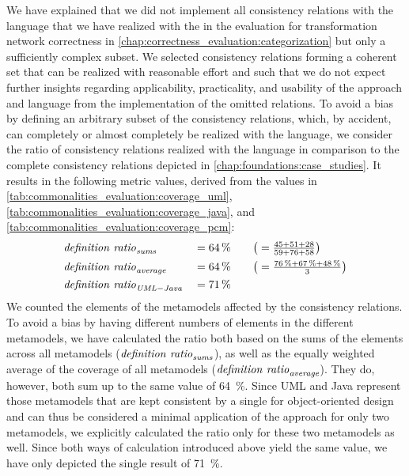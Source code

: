 We have explained that we did not implement all consistency relations with the \commonalities language that we have realized with the \reactionslanguage in the evaluation for transformation network correctness in \autoref{chap:correctness_evaluation:categorization} but only a sufficiently complex subset.
We selected consistency relations forming a coherent set that can be realized with reasonable effort and such that we do not expect further insights regarding applicability, practicality, and usability of the \commonalities approach and language from the implementation of the omitted relations.
To avoid a bias by defining an arbitrary subset of the consistency relations, which, by accident, can completely or almost completely be realized with the \commonalities language, we consider the ratio of consistency relations realized with the \commonalities language in comparison to the complete consistency relations depicted in \autoref{chap:foundations:case_studies}.
It results in the following metric values, derived from the values in \autoref{tab:commonalities_evaluation:coverage_uml}, \autoref{tab:commonalities_evaluation:coverage_java}, and \autoref{tab:commonalities_evaluation:coverage_pcm}:
\begin{alignat*}{3}
    &
	\mathit{definition\ ratio}_{\mathit{sums}} &&= \SI{64}{\percent} \quad  &&\big(= \tfrac{45 + 51 + 28}{59 + 76 + 58}\big)\\
	& 
	\mathit{definition\ ratio}_{\mathit{average}} &&= \SI{64}{\percent} \quad &&\big(= \tfrac{\SI{76}{\percent} + \SI{67}{\percent} + \SI{48}{\percent}}{3} \big) \\
	&
	\mathit{definition\ ratio}_{\mathit{UML-Java}} &&= \SI{71}{\percent}
\end{alignat*}
We counted the elements of the metamodels affected by the consistency relations.
To avoid a bias by having different numbers of elements in the different metamodels, we have calculated the ratio both based on the sums of the elements across all metamodels ($\mathvariable{definition\ ratio}_{\mathvariable{sums}}$), as well as the equally weighted average of the coverage of all metamodels ($\mathvariable{definition\ ratio}_{\mathvariable{average}}$).
They do, however, both sum up to the same value of \SI{64}{\percent}.
Since \gls{UML} and Java represent those metamodels that are kept consistent by a single \conceptmetamodel for object-oriented design and can thus be considered a minimal application of the \commonalities approach for only two metamodels, we explicitly  calculated the ratio only for these two metamodels as well.
Since both ways of calculation introduced above yield the same value, we have only depicted the single result of \SI{71}{\percent}.

